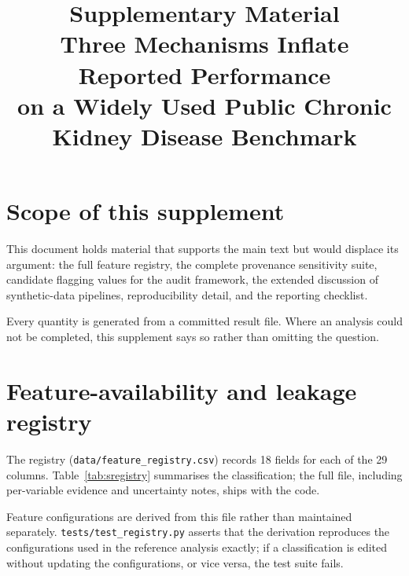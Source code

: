\documentclass[conference]{IEEEtran}
\begin{document}
\title{Supplementary Material\\
Three Mechanisms Inflate Reported Performance\\
on a Widely Used Public Chronic Kidney Disease Benchmark}

\author{
}

\maketitle

\section{Scope of this supplement}

This document holds material that supports the main text but would displace
its argument: the full feature registry, the complete provenance sensitivity
suite, candidate flagging values for the audit framework, the extended
discussion of synthetic-data pipelines, reproducibility detail, and the
reporting checklist.

Every quantity is generated from a committed result file. Where an analysis
could not be completed, this supplement says so rather than omitting the
question.

\section{Feature-availability and leakage registry}

The registry (\texttt{data/feature\_registry.csv}) records 18 fields for each
of the 29 columns. Table~\ref{tab:sregistry} summarises the classification;
the full file, including per-variable evidence and uncertainty notes, ships
with the code.

\begin{table}[h]
\caption{Variables per leakage category.}
\label{tab:sregistry}
\centering
\footnotesize

\end{table}

Feature configurations are derived from this file rather than maintained
separately. \texttt{tests/test\_registry.py} asserts that the derivation
reproduces the configurations used in the reference analysis exactly; if a
classification is edited without updating the configurations, or vice versa,
the test suite fails.
\end{document}
